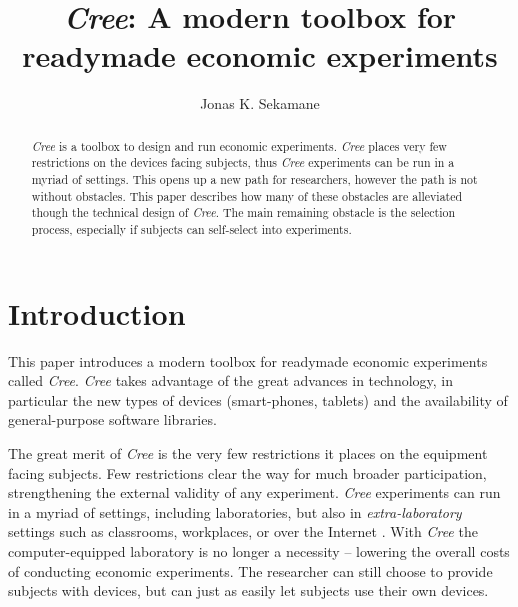 \documentclass[preprint, 12pt]{elsarticle}
\newcommand{\Cree}{\emph{Cree}\xspace}
\begin{document}
\begin{frontmatter}

\title{\emph{Cree}: A modern toolbox for readymade economic experiments}
\author{Jonas K. Sekamane}

\begin{abstract}
{\Cree is a toolbox to design and run economic experiments. \Cree places very few restrictions on the devices facing subjects, thus \Cree experiments can be run in a myriad of settings. This opens up a new path for researchers, however the path is not without obstacles. This paper describes how many of these obstacles are alleviated though the technical design of \Cree. The main remaining obstacle is the selection process, especially if subjects can self-select into experiments.}
\end{abstract}

\end{frontmatter}

\singlespacing
\setcounter{tocdepth}{1}
\makeatletter
\makeatother
\onehalfspacing

\newpage

\section{Introduction}
\label{S:Introduction}

This paper introduces a modern toolbox for readymade economic experiments called \Cree. \Cree takes advantage of the great advances in technology, in particular the new types of devices (smart-phones, tablets) and the availability of general-purpose software libraries. 

The great merit of \Cree is the very few restrictions it places on the equipment facing subjects. Few restrictions clear the way for much broader participation, strengthening the external validity of any experiment. \Cree experiments can run in a myriad of settings, including laboratories, but also in \emph{extra-laboratory} settings such as classrooms, workplaces, or over the Internet \citep{Charness_Gneezy_Kuhn_2013}. With \Cree the computer-equipped laboratory is no longer a necessity -- lowering the overall costs of conducting economic experiments. The researcher can still choose to provide subjects with devices, but can just as easily let subjects use their own devices. 
\end{document}
